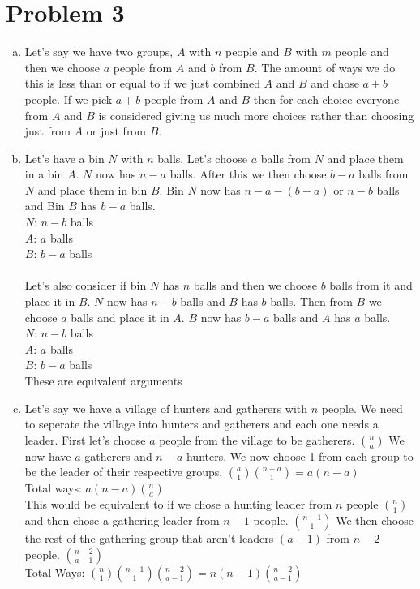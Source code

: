 \documentclass[11pt,letterpaper]{article}
\begin{document}
\section*{Problem 3}
\begin{enumerate}[(a)]
\item
Let's say we have two groups, $A$ with $n$ people and $B$ with $m$ people and then we choose $a$ people from $A$ and $b$ from $B$. The amount of ways we do this is less than or equal to if we just combined $A$ and $B$ and chose $a+b$ people. If we pick $a+b$ people from $A$ and $B$ then for each choice everyone from $A$ and $B$ is considered giving us much more choices rather than choosing just from $A$ or just from $B$. 
\item
Let's have a bin $N$ with $n$ balls. Let's choose $a$ balls from $N$ and place them in a bin $A$. $N$ now has $n-a$ balls. After this we then choose $b-a$ balls from $N$ and place them in bin $B$. Bin $N$ now has $n-a-(b-a)$ or $n-b$ balls and Bin $B$ has $b-a$ balls.\\
$N$: $n-b$ balls\\
$A$: $a$ balls\\
$B$: $b-a$ balls\\\\
Let's also consider if bin $N$ has $n$ balls and then we choose $b$ balls from it and place it in $B$. $N$ now has $n-b$ balls and $B$ has $b$ balls. Then from $B$ we choose $a$ balls and place it in $A$. $B$ now has $b-a$ balls and $A$ has $a$ balls.\\
$N$: $n-b$ balls\\
$A$: $a$ balls\\
$B$: $b-a$ balls\\
These are equivalent arguments
\item
Let's say we have a village of hunters and gatherers with $n$ people. We need to seperate the village into hunters and gatherers and each one needs a leader. First let's choose $a$ people from the village to be gatherers. ${n\choose a}$ We now have $a$ gatherers and $n-a$ hunters. We now choose 1 from each group to be the leader of their respective groups. ${a\choose 1}{n-a \choose 1}= a(n-a)$\\ Total ways: $a(n-a){n\choose a}$\\
This would be equivalent to if we chose a hunting leader from $n$ people ${n \choose 1}$and then chose a gathering leader from $n-1$ people. ${n-1\choose 1}$ We then choose the rest of the gathering group that aren't leaders $(a-1)$ from $n-2$ people. ${n-2\choose a-1}$\\
Total Ways: ${n \choose 1}{n-1 \choose 1}{n-2\choose a-1} = n(n-1){n-2\choose a-1}$\\\\
\end{enumerate}
\clearpage
\end{document}
